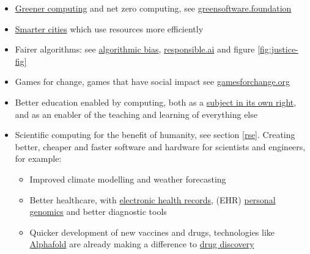 \documentclass[
]{book}
\providecommand{\tightlist}{%
  \setlength{\itemsep}{0pt}\setlength{\parskip}{0pt}}
\begin{document}
\begin{itemize}
\tightlist
\item
  \href{https://en.wikipedia.org/wiki/Green_computing}{Greener computing} and net zero computing, see \href{https://greensoftware.foundation/}{greensoftware.foundation} \citep{Knowles2022, netzero}
\item
  \href{https://en.wikipedia.org/wiki/Smart_city}{Smarter cities} which use resources more efficiently \citep{smartercities}
\item
  Fairer algorithms: see \href{https://en.wikipedia.org/wiki/Algorithmic_bias}{algorithmic bias}, \href{https://www.responsible.ai/}{responsible.ai} and figure \ref{fig:justice-fig}
\item
  Games for change, games that have social impact see \href{https://www.gamesforchange.org/}{gamesforchange.org}
\item
  Better education enabled by computing, both as a \href{https://en.wikipedia.org/wiki/Computer_science_education}{subject in its own right}, and as an enabler of the teaching and learning of everything else
\item
  Scientific computing for the benefit of humanity, see section \ref{rse}. Creating better, cheaper and faster software and hardware for scientists and engineers, for example:

  \begin{itemize}
  \tightlist
  \item
    Improved climate modelling and weather forecasting
  \item
    Better healthcare, with \href{https://en.wikipedia.org/wiki/Electronic_health_record}{electronic health records}, (EHR) \href{https://en.wikipedia.org/wiki/Personal_genomics}{personal genomics} and better diagnostic tools
  \item
    Quicker development of new vaccines and drugs, technologies like \href{https://en.wikipedia.org/wiki/AlphaFold}{Alphafold} are already making a difference to \href{https://en.wikipedia.org/wiki/Drug_discovery}{drug discovery} \citep{Jumper2021}
  \end{itemize}
\end{itemize}
\end{document}
